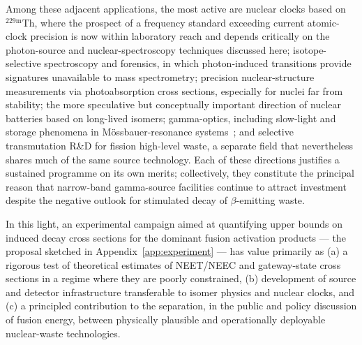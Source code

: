 \documentclass[conference]{IEEEtran}
\begin{document}
Among these adjacent applications, the most active are nuclear clocks based on $^{229\mathrm{m}}$Th, where the prospect of a frequency standard exceeding current atomic-clock precision is now within laboratory reach and depends critically on the photon-source and nuclear-spectroscopy techniques discussed here; isotope-selective spectroscopy and forensics, in which photon-induced transitions provide signatures unavailable to mass spectrometry; precision nuclear-structure measurements via photoabsorption cross sections, especially for nuclei far from stability; the more speculative but conceptually important direction of nuclear batteries based on long-lived isomers; gamma-optics, including slow-light and storage phenomena in M\"ossbauer-resonance systems~\cite{chumakov2018narrow}; and selective transmutation R\&D for fission high-level waste, a separate field that nevertheless shares much of the same source technology. Each of these directions justifies a sustained programme on its own merits; collectively, they constitute the principal reason that narrow-band gamma-source facilities continue to attract investment despite the negative outlook for stimulated decay of $\beta$-emitting waste.

In this light, an experimental campaign aimed at quantifying upper bounds on induced decay cross sections for the dominant fusion activation products --- the proposal sketched in Appendix~\ref{app:experiment} --- has value primarily as (a) a rigorous test of theoretical estimates of NEET/NEEC and gateway-state cross sections in a regime where they are poorly constrained, (b) development of source and detector infrastructure transferable to isomer physics and nuclear clocks, and (c) a principled contribution to the separation, in the public and policy discussion of fusion energy, between physically plausible and operationally deployable nuclear-waste technologies.
\end{document}
